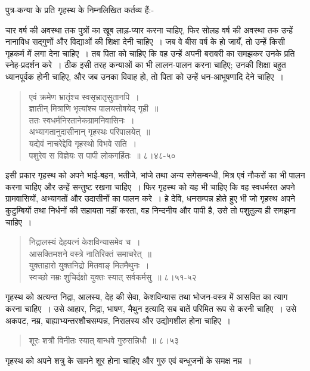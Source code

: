पुत्र-कन्या के प्रति गृहस्थ के निम्नलिखित कर्तव्य हैं:-

चार वर्ष की अवस्था तक पुत्रों का खूब लाड़-प्यार करना चाहिए, फिर सोलह वर्ष की अवस्था तक उन्हें नानाविध सद्गुणों और विद्याओं की शिक्षा देनी चाहिए~। जब वे बीस वर्ष के हो जायँ, तो उन्हें किसी गृहकर्म में लगा देना चाहिए~। तब पिता को चाहिए कि वह उन्हें अपनी बराबरी का समझकर उनके प्रति स्नेह-प्रदर्शन करे~। ठीक इसी तरह कन्याओं का भी लालन-पालन करना चाहिए; उनकी शिक्षा बहुत ध्यानपूर्वक होनी चाहिए, और जब उनका विवाह हो, तो पिता को उन्हें धन-आभूषणादि देने चाहिए~।

\begin{verse}
एवं क्रमेण भ्रातृंश्च स्वसृभ्रातृसुतानपि~।\\ ज्ञातीन् मित्राणि भृत्यांश्च पालयत्तोषयेद् गृही~॥\\ ततः स्वधर्मनिरतानेकग्रामनिवासिनः~।\\ अभ्यागतानुदासीनान् गृहस्थः परिपालयेत्~॥\\ यद्येवं नाचरेद्देवि गृहस्थो विभवे सति~।\\ पशुरेव स विज्ञेयः स पापी लोकगर्हितः~॥ ८।४८-५०
\end{verse}

इसी प्रकार गृहस्थ को अपने भाई-बहन, भतीजे, भांजे तथा अन्य सगेसम्बन्धी, मित्र एवं नौकरों का भी पालन करना चाहिए और उन्हें सन्तुष्ट रखना चाहिए~। फिर गृहस्थ को यह भी चाहिए कि वह स्वधर्मरत अपने ग्रामवासियों, अभ्यागतों और उदासीनों का पालन करे~। हे देवि, धनसम्पन्न होते हुए भी जो गृहस्थ अपने कुटुम्बियों तथा निर्धनों की सहायता नहीं करता, वह निन्दनीय और पापी है, उसे तो पशुतुल्य ही समझना चाहिए~।

\begin{verse}
निद्रालस्यं देहयत्नं केशविन्यासमेव च~।\\ आसक्तिमशने वस्त्रे नातिरिक्तं समाचरेत्~॥\\ युक्ताहारो युक्तनिद्रो मितवाङ् मितमैथुनः~।\\ स्वच्छो नम्रः शुचिर्दक्षो युक्तः स्यात् सर्वकर्मसु~॥ ८।५१-५२
\end{verse}

गृहस्थ को अत्यन्त निद्रा, आलस्य, देह की सेवा, केशविन्यास तथा भोजन-वस्त्र में आसक्ति का त्याग करना चाहिए~। उसे आहार, निद्रा, भाषण, मैथुन इत्यादि सब बातें परिमित रूप से करनी चाहिए~। उसे अकपट, नम्र, बाह्याभ्यन्तरशौच\-सम्पन्न, निरालस्य और उद्योगशील होना चाहिए~।

\begin{verse}
शूरः शत्रौ विनीतः स्यात् बान्धवे गुरुसन्निधौ~॥ ८।५३
\end{verse}

गृहस्थ को अपने शत्रु के सामने शूर होना चाहिए और गुरु एवं बन्धुजनों के समक्ष नम्र~।

